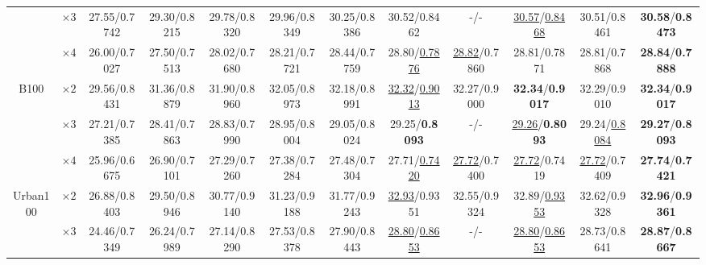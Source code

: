 \documentclass{bmvc2k}
\begin{document}
\begin{table*}[htbp]
{\begin{tabular}{|c|c|c|c|c|c|c|c|c|c|c|c|}
			                                        &       $\times3$        &       27.55/0.7742       &      29.30/0.8215       &      29.78/0.8320      &    29.96/0.8349     &  30.25/0.8386   &           {30.52}/{0.8462}           &           -/-            & \underline{30.57}/\underline{0.8468} &             30.51/0.8461             &    \textbf{30.58}/\textbf{0.8473}    \\
			                                        &       $\times4$        &       26.00/0.7027       &      27.50/0.7513       &      28.02/0.7680      &    28.21/0.7721     &  28.44/0.7759   &       28.80/\underline{0.7876}       & \underline{28.82}/0.7860 &             28.81/0.7871             &             28.81/0.7868             &    \textbf{28.84}/\textbf{0.7888}    \\ \hline\hline
			         \multirow{3}{*}{B100}          &       $\times2$        &       29.56/0.8431       &      31.36/0.8879       &      31.90/0.8960      &    32.05/0.8973     &  32.18/0.8991   & \underline{32.32}/\underline{0.9013} &       32.27/0.9000       &    \textbf{32.34}/\textbf{0.9017}    &             32.29/0.9010             &    \textbf{32.34}/\textbf{0.9017}    \\
			                                        &       $\times3$        &       27.21/0.7385       &      28.41/0.7863       &      28.83/0.7990      &    28.95/0.8004     &  29.05/0.8024   &       {29.25}/\textbf{0.8093}        &           -/-            &  \underline {29.26}/\textbf{0.8093}  &      29.24/\underline {0.8084}       &    \textbf{29.27}/\textbf{0.8093}    \\
			                                        &       $\times4$        &       25.96/0.6675       &      26.90/0.7101       &      27.29/0.7260      &    27.38/0.7284     &  27.48/0.7304   &       27.71/\underline{0.7420}       & \underline{27.72}/0.7400 &      \underline{27.72}/{0.7419}      &       \underline{27.72}/0.7409       &    \textbf{27.74}/\textbf{0.7421}    \\ \hline\hline
			       \multirow{3}{*}{Urban100}        &       $\times2$        &       26.88/0.8403       &      29.50/0.8946       &      30.77/0.9140      &    31.23/0.9188     &  31.77/0.9243   &      \underline{32.93}/{0.9351}      &       32.55/0.9324       &       32.89/\underline{0.9353}       &             32.62/0.9328             &    \textbf{32.96}/\textbf{0.9361}    \\
			                                        &       $\times3$        &       24.46/0.7349       &      26.24/0.7989       &      27.14/0.8290      &    27.53/0.8378     &  27.90/0.8443   & \underline{28.80}/\underline{0.8653} &           -/-            & \underline{28.80}/\underline{0.8653} &             28.73/0.8641             &    \textbf{28.87}/\textbf{0.8667}    \\

\end{tabular}}
\end{table*}
\end{document}
